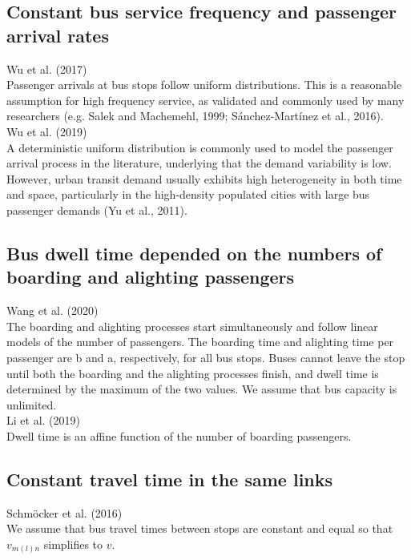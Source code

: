 \documentclass{article}
\begin{document}
\subsection*{Constant bus service frequency and passenger arrival rates} 
\noindent Wu et al. (2017)\\
Passenger arrivals at bus stops follow uniform distributions. 
This is a reasonable assumption for high frequency service, as validated and commonly used by many researchers 
(e.g. Salek and Machemehl, 1999; Sánchez-Martínez et al., 2016).\\

\noindent Wu et al. (2019)\\
A deterministic uniform distribution is commonly used to model the passenger arrival process in the literature, underlying that the demand variability is low.
However, urban transit demand usually exhibits high heterogeneity in both time and space, 
particularly in the high-density populated cities with large bus passenger demands (Yu et al., 2011).\\

\subsection*{Bus dwell time depended on the numbers of boarding and alighting passengers}
\noindent Wang et al. (2020)\\
The boarding and alighting processes start simultaneously and follow linear models of the number of passengers. 
The boarding time and alighting time per passenger are b and a, respectively, for all bus stops. 
Buses cannot leave the stop until both the boarding and the alighting processes finish, and dwell time is determined by the maximum of the two values. 
We assume that bus capacity is unlimited.\\

\noindent Li et al. (2019)\\
Dwell time is an affine function of the number of boarding passengers.\\

\subsection*{Constant travel time in the same links}
\noindent Schmöcker et al. (2016)\\
We assume that bus travel times between stops are constant and equal so that $v_{m(l)n}$ simplifies to $v$.\\
\end{document}
